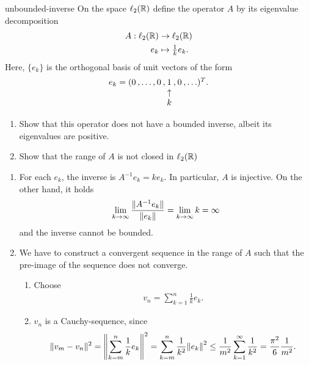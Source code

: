 \begin{Problem}{unbounded-inverse}
  On the space $\ell_2(\mathbb R)$ define the operator $A$ by its eigenvalue
  decomposition
  \begin{align*}
    A: \ell_2(\mathbb R) &\to \ell_2(\mathbb R)\\
    e_k & \mapsto \tfrac1k e_k.
  \end{align*}
  Here, $\{e_k\}$ is the orthogonal basis of unit vectors of the form
  \begin{gather*}
    \arraycolsep0.1em
    \begin{array}{cccccccc}
      e_k =(0&,\ldots,&0&,&1&,&0&,\ldots)^T.\\
      &&&&\uparrow\\
      &&&&k
    \end{array}
  \end{gather*}
  \begin{enumerate}
  \item Show that this operator does not have a bounded inverse, albeit
    its eigenvalues are positive.
  \item Show that the range of $A$ is not closed in $\ell_2(\mathbb R)$
  \end{enumerate}
\begin{solution}
  \begin{enumerate}
  \item For each $e_k$, the inverse is $A^{-1} e_k = k e_k$. In particular, $A$ is injective.
    On the other hand, it holds
    \begin{gather*}
      \lim_{k\to\infty}\frac{\lVert A^{-1}e_k\rVert}{\lVert e_k\rVert}=\lim_{k\to\infty}k=\infty
    \end{gather*}
      and the inverse cannot be bounded.
  \item We have to construct a convergent sequence in the range of $A$
    such that the pre-image of the sequence does not converge.
    \begin{enumerate}
    \item Choose
      \begin{gather*}
        v_n = \sum_{k=1}^n \frac1k e_k.
      \end{gather*}
      \item $v_n$ is a Cauchy-sequence, since
        \begin{gather*}
          \norm{v_m-v_n}^2 = \norm*{\sum_{k=m}^n \frac1k e_k}^2
          = \sum_{k=m}^n \frac1{k^2}\norm*{e_k}^2
          \le \frac1{m^2} \sum_{k=1}^\infty \frac1{k^2}
          = \frac{\pi^2}{6} \frac1{m^2}.
        \end{gather*}

\end{enumerate}
\end{enumerate}
\end{solution}
\end{Problem}
